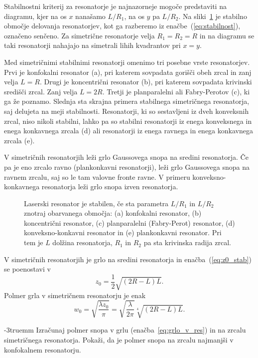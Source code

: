 Stabilnostni kriterij za resonatorje je najnazorneje mogoče predstaviti na diagramu, 
kjer na os $x$ nanašamo $L/R_{1}$, na os $y$ pa $L/R_{2}$. Na 
sliki~\ref{fig:Podrocje-stabilnih-resonatorjev} je stabilno območje delovanja 
resonatorjev, kot ga razberemo iz enačbe~(\ref{eq:stabilnost}), označeno senčeno.
Za simetrične resonatorje 
velja $R_{1}=R_{2}=R$ in na diagramu se taki resonatorji nahajajo na simetrali 
lihih kvadrantov pri $x=y$. 

Med simetričnimi stabilnimi resonatorji omenimo tri posebne vrste resonatorjev.
Prvi je konfokalni resonator (a), 
pri katerem sovpadata gorišči obeh zrcal in zanj velja $L=R$. Drugi je 
koncentrični resonator (b), pri katerem sovpadata 
krivinski središči zrcal. Zanj velja $L=2R$.
Tretji je planparalelni ali Fabry-Perotov (c), ki ga že poznamo. 
Slednja sta skrajna primera stabilnega simetričnega resonatorja, saj delujeta na meji stabilnosti. 
Resonatorji, ki so sestavljeni iz dveh konveksnih zrcal, niso nikoli stabilni, lahko
pa so stabilni resonatorji iz enega konveksnega in enega konkavnega zrcala (d)
ali resonatorji iz enega ravnega in enega konkavnega zrcala (e). 

V simetričnih resonatorjih leži grlo Gaussovega snopa na sredini resonatorja.
Če pa je eno zrcalo ravno (plankonkavni resonatorji), leži grlo Gaussovega snopa 
na ravnem zrcalu, saj so le tam valovne fronte ravne. V primeru konveksno-konkavnega 
resonatorja leži grlo snopa izven resonatorja. 

\begin{figure}[ht]
\centering
\def\svgwidth{95truemm} 

\caption{Laserski resonator je stabilen, 
če sta parametra $L/R_{1}$ in $L/R_{2}$ znotraj obarvanega območja:
(a) konfokalni resonator,
(b) koncentrični resonator, 
(c) planparalelni (Fabry-Perot) resonator, 
(d) konveksno-konkavni resonator 
in (e) plankonkavni resonator. Pri tem je $L$ dolžina resonatorja, $R_1$ in $R_2$ pa sta
krivinska radija zrcal.}
\label{fig:Podrocje-stabilnih-resonatorjev}
\end{figure}

V simetričnih resonatorjih je grlo na sredini resonatorja in enačba~(\ref{eq:z0_stab}) 
se poenostavi v 
\begin{equation}
z_{0}=\frac{1}{2}\sqrt{(2R-L)L}.
\label{eq:zosim}
\end{equation}
Polmer grla v simetričnem resonatorju je enak
\begin{equation}
w_{0}=\sqrt{\frac{\lambda z_{0}}{\pi}}=\sqrt{\frac{\lambda}{2\pi}}\sqrt[4]{(2R-L)L}.
\label{eq:grlo_v_res}
\end{equation}
\begin{definition}
\label{naloga:uklon_konf}
\vglue-3truemm
Izračunaj polmer
snopa v grlu (enačba~\ref{eq:grlo_v_res}) in na zrcalu simetričnega resonatorja. 
Pokaži, da je polmer snopa na zrcalu najmanjši v konfokalnem resonatorju. 
\end{definition} 

